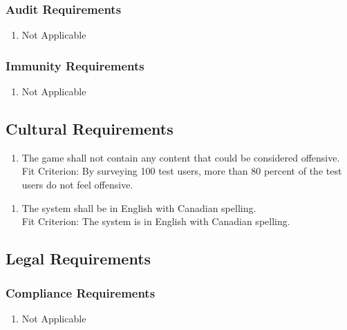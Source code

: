 \documentclass[12pt, titlepage]{article}
\begin{document}
\subsubsection{Audit Requirements}
\label{ssub:audit_requirements}
\begin{enumerate}[{SR}4. ]
	\item Not Applicable
\end{enumerate}

\subsubsection{Immunity Requirements}
\label{ssub:immunity_requirements}
\begin{enumerate}[{SR}5. ]
	\item Not Applicable
\end{enumerate}


\subsection{Cultural Requirements}
\begin{enumerate}[{CR}1. ]
	\item The game shall not contain any content that could be considered offensive.
	\\
	
	Fit Criterion: By  surveying  100  test  users, more than 80 percent of the test users do not feel offensive.
\end{enumerate}

\begin{enumerate}[{CR}2. ]
	\item The system shall be in English with Canadian spelling.
	\\
	
	Fit Criterion: The system is in English with Canadian spelling.
\end{enumerate}

\subsection{Legal Requirements}
\label{sub:legal_requirements}

\subsubsection{Compliance Requirements}
\label{ssub:compliance_requirements}
\begin{enumerate}[{LR}1. ]
	\item Not Applicable
\end{enumerate}
\end{document}
